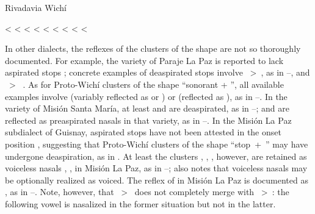 \ea
Rivadavia Wichí \citep[38–41, 48]{JT09-cap,JT09-th} \label{wi-cx-riv}\\
    \begin{xlist}
        \ex {} <  \label{wi-cx-riv-nemhe}
        \ex {} < 
        \ex {} < 
        \ex {} <  \label{wi-cx-riv-atsinha}
        \ex {} <  \label{wi-cx-riv-ember}
        \ex {} < 
        \ex {} < 
        \ex {} <  \label{wi-cx-riv-clay}
        \ex {} <  \label{wi-cx-riv-married}
        \ex {} \label{wi-cx-riv-talk}
    \end{xlist}
\z
{}

In other dialects, the reflexes of the clusters of the shape  are not so thoroughly documented. For example, the variety of Paraje La Paz is reported to lack aspirated stops \citep{AFG067}; concrete examples of deaspirated stops involve ~>~, as in –, and ~>~ . As for Proto-Wichí clusters of the shape ``sonorant + '', all available examples involve  (variably reflected as  or ) or  (reflected as ), as in –. In the variety of Misión Santa María, at least  and  are deaspirated, as in –;  and  are reflected as preaspirated nasals in that variety, as in –. In the Misión La Paz subdialect of Guisnay, aspirated stops have not been attested in the onset position \citep{MA08}, suggesting that Proto-Wichí clusters of the shape ``stop~+~'' may have undergone deaspiration, as in . At least the clusters , , , however, are retained as voiceless nasals , ,  in Misión La Paz, as in –; \citet[98]{MA08} also notes that voiceless nasals may be optionally realized as voiced. The reflex of  in Misión La Paz is documented as , as in –. Note, however, that ~>~ does not completely merge with ~>~: the following vowel is nasalized in the former situation but not in the latter.

